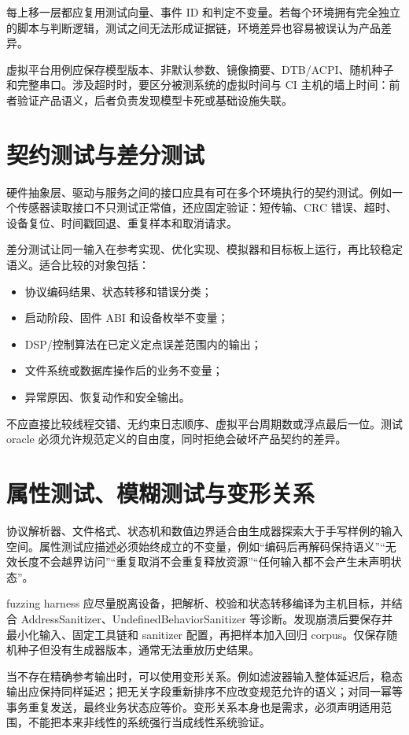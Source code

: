 每上移一层都应复用测试向量、事件 ID 和判定不变量。若每个环境拥有完全独立的脚本与判断逻辑，测试之间无法形成证据链，环境差异也容易被误认为产品差异。

虚拟平台用例应保存模型版本、非默认参数、镜像摘要、DTB/ACPI、随机种子和完整串口。涉及超时时，要区分被测系统的虚拟时间与 CI 主机的墙上时间：前者验证产品语义，后者负责发现模型卡死或基础设施失联。

\section{契约测试与差分测试}

硬件抽象层、驱动与服务之间的接口应具有可在多个环境执行的契约测试。例如一个传感器读取接口不只测试正常值，还应固定验证：短传输、CRC 错误、超时、设备复位、时间戳回退、重复样本和取消请求。

差分测试让同一输入在参考实现、优化实现、模拟器和目标板上运行，再比较稳定语义。适合比较的对象包括：

\begin{itemize}
  \item 协议编码结果、状态转移和错误分类；
  \item 启动阶段、固件 ABI 和设备枚举不变量；
  \item DSP/控制算法在已定义定点误差范围内的输出；
  \item 文件系统或数据库操作后的业务不变量；
  \item 异常原因、恢复动作和安全输出。
\end{itemize}

不应直接比较线程交错、无约束日志顺序、虚拟平台周期数或浮点最后一位。测试 oracle 必须允许规范定义的自由度，同时拒绝会破坏产品契约的差异。

\section{属性测试、模糊测试与变形关系}

协议解析器、文件格式、状态机和数值边界适合由生成器探索大于手写样例的输入空间。属性测试应描述必须始终成立的不变量，例如“编码后再解码保持语义”“无效长度不会越界访问”“重复取消不会重复释放资源”“任何输入都不会产生未声明状态”。

fuzzing harness 应尽量脱离设备，把解析、校验和状态转移编译为主机目标，并结合 AddressSanitizer、UndefinedBehaviorSanitizer 等诊断。发现崩溃后要保存并最小化输入、固定工具链和 sanitizer 配置，再把样本加入回归 corpus。仅保存随机种子但没有生成器版本，通常无法重放历史结果。

当不存在精确参考输出时，可以使用变形关系。例如滤波器输入整体延迟后，稳态输出应保持同样延迟；把无关字段重新排序不应改变规范允许的语义；对同一幂等事务重复发送，最终业务状态应等价。变形关系本身也是需求，必须声明适用范围，不能把本来非线性的系统强行当成线性系统验证。

